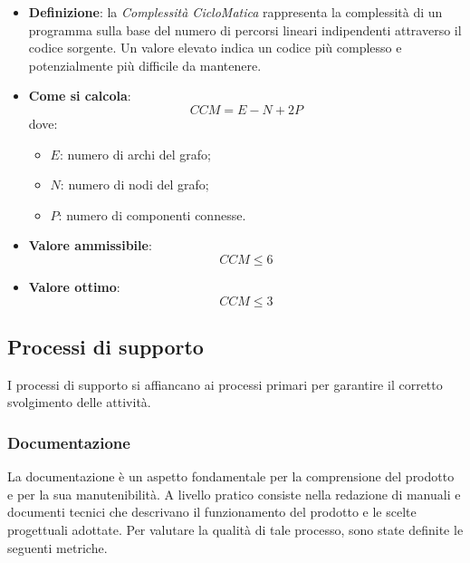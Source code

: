\begin{itemize}
	\item \textbf{Definizione}: la \textit{Complessità CicloMatica} rappresenta la complessità di un programma sulla base del numero di percorsi lineari indipendenti attraverso il codice sorgente. Un valore elevato indica un codice più complesso e potenzialmente più difficile da mantenere.
	\item \textbf{Come si calcola}: \begin{equation*}CCM = E - N + 2P\end{equation*} dove:
		\begin{itemize}
			\item $E$: numero di archi del grafo;
			\item $N$: numero di nodi del grafo;
			\item $P$: numero di componenti connesse.
		\end{itemize}
	\item \textbf{Valore ammissibile}: \begin{equation*}CCM \leq 6\end{equation*}
	\item \textbf{Valore ottimo}: \begin{equation*}CCM \leq 3\end{equation*}
\end{itemize}



\subsection{Processi di supporto}
I processi di supporto si affiancano ai processi primari per garantire il corretto svolgimento delle attività.

\subsubsection{Documentazione}
La documentazione è un aspetto fondamentale per la comprensione del prodotto e per la sua manutenibilità. A livello pratico consiste nella redazione di manuali e documenti tecnici che descrivano il funzionamento del prodotto e le scelte progettuali adottate. Per valutare la qualità di tale processo, sono state definite le seguenti metriche.

